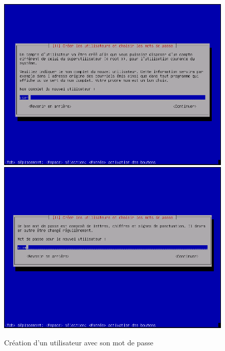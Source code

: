 \begin{figure}
 \includegraphics[scale=0.35]{img/install/Deb_inst_7.png}
 \includegraphics[scale=0.35]{img/install/Deb_inst_8.png}
 \caption{Création d'un utilisateur avec son mot de passe}
\end{figure}
